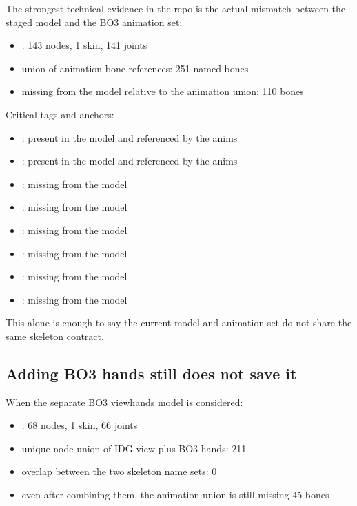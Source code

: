 \documentclass[11pt]{article}
\begin{document}
The strongest technical evidence in the repo is the actual mismatch between the staged model and the BO3 animation set:

\begin{itemize}
  \item {}: 143 nodes, 1 skin, 141 joints
  \item union of  animation bone references: 251 named bones
  \item missing from the model relative to the animation union: 110 bones
\end{itemize}

Critical tags and anchors:

\begin{itemize}
  \item {}: present in the model and referenced by the anims
  \item {}: present in the model and referenced by the anims
  \item {}: missing from the model
  \item {}: missing from the model
  \item {}: missing from the model
  \item {}: missing from the model
  \item {}: missing from the model
  \item {}: missing from the model
\end{itemize}

This alone is enough to say the current model and animation set do not share the same skeleton contract.

\subsection{Adding BO3 hands still does not save it}

When the separate BO3 viewhands model is considered:

\begin{itemize}
  \item {}: 68 nodes, 1 skin, 66 joints
  \item unique node union of IDG view plus BO3 hands: 211
  \item overlap between the two skeleton name sets: 0
  \item even after combining them, the animation union is still missing 45 bones
\end{itemize}
\end{document}
